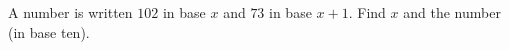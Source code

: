 A number is written $102$ in base $x$ and $73$ in base $x+1$. Find $x$ and the number (in base ten).
